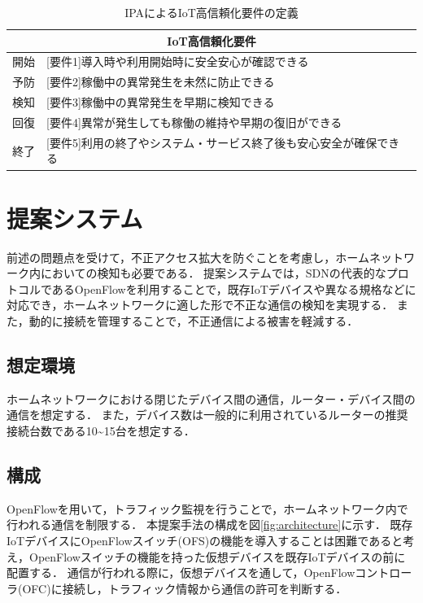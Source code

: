 \documentclass[a4paper,10pt,twocolumn,uplatex]{jsarticle}
\begin{document}
\begin{table}[!bt]
  \caption{IPAによるIoT高信頼化要件の定義}
  \label{tab:IPA}
  \centering
  \begin{tabular}{c|l}
    \hline
    \multicolumn{2}{c}{IoT高信頼化要件}                                      \\
    \hline \hline
    開始 & [要件1]導入時や利用開始時に安全安心が確認できる                   \\
    予防 & [要件2]稼働中の異常発生を未然に防止できる                         \\
    検知 & [要件3]稼働中の異常発生を早期に検知できる                         \\
    回復 & [要件4]異常が発生しても稼働の維持や早期の復旧ができる             \\
    終了 & [要件5]利用の終了やシステム・サービス終了後も安心安全が確保できる \\
    \hline
  \end{tabular}
\end{table}



\section{提案システム}
前述の問題点を受けて，不正アクセス拡大を防ぐことを考慮し，ホームネットワーク内においての検知も必要である．
提案システムでは，SDNの代表的なプロトコルであるOpenFlow\cite{OpenFlow}を利用することで，既存IoTデバイスや異なる規格などに対応でき，ホームネットワークに適した形で不正な通信の検知を実現する．
また，動的に接続を管理することで，不正通信による被害を軽減する．

\subsection{想定環境}
ホームネットワークにおける閉じたデバイス間の通信，ルーター・デバイス間の通信を想定する．
また，デバイス数は一般的に利用されているルーターの推奨接続台数である10\textasciitilde15台を想定する．

\subsection{構成}
OpenFlowを用いて，トラフィック監視を行うことで，ホームネットワーク内で行われる通信を制限する．
本提案手法の構成を図\ref{fig:architecture}に示す．
既存IoTデバイスにOpenFlowスイッチ(OFS)の機能を導入することは困難であると考え，OpenFlowスイッチの機能を持った仮想デバイスを既存IoTデバイスの前に配置する．
通信が行われる際に，仮想デバイスを通して，OpenFlowコントローラ(OFC)に接続し，トラフィック情報から通信の許可を判断する．
\end{document}
